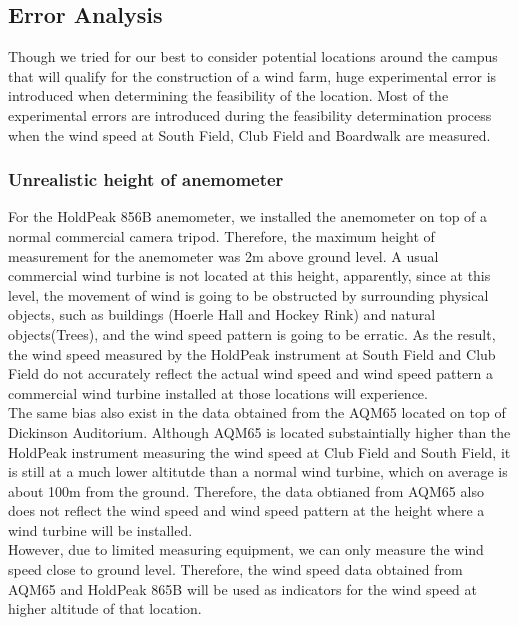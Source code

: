 \documentclass[review]{elsarticle}
\begin{document}
\subsection{Error Analysis}
\label{sec:analysis:erroranalysis}

Though we tried for our best to consider potential locations around the campus that will qualify for the construction of a wind farm, huge experimental error is introduced when determining 
the feasibility of the location. Most of the experimental errors are introduced during the feasibility determination process when the wind speed at South Field, Club Field and Boardwalk are measured.

\subsubsection{Unrealistic height of anemometer}
\label{sec:analysis:erroranalysis:unrealisticheight}
For the HoldPeak 856B anemometer, we installed the anemometer on top of a normal commercial camera tripod. Therefore, the maximum height of measurement for the anemometer was 2m above ground level. 
A usual commercial wind turbine is not located at this height, apparently, since at this level, the movement of wind is going to be obstructed by surrounding physical objects, such as buildings 
(Hoerle Hall and Hockey Rink) and natural objects(Trees), and the wind speed pattern is going to be erratic. As the result, the wind speed measured by the HoldPeak instrument at South Field and 
Club Field do not accurately reflect the actual wind speed and wind speed pattern a commercial wind turbine installed at those locations will experience. 
\\\indent The same bias also exist in the data obtained from the AQM65 located on top of Dickinson Auditorium. Although AQM65 is located substaintially higher than the HoldPeak instrument measuring 
the wind speed at Club Field and South Field, it is still at a much lower altitutde than a normal wind turbine, which on average is about 100m from the ground. Therefore, the data obtianed from 
AQM65 also does not reflect the wind speed and wind speed pattern at the height where a wind turbine will be installed. 
\\\indent However, due to limited measuring equipment, we can only measure the wind speed close to ground level. Therefore, 
the wind speed data obtained from AQM65 and HoldPeak 865B will be used as indicators for the wind speed at higher altitude of that location.
\end{document}
